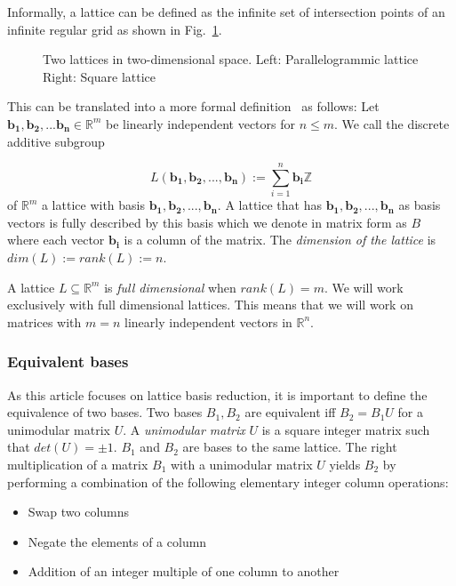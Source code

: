 \documentclass[10pt, a4paper]{article}
\renewcommand{\vec}[1]{\mathbf{#1}}
\begin{document}
Informally, a lattice can be defined as the infinite set of intersection points of an infinite regular grid as shown in Fig.~\ref{fig:latti}.
\begin{figure}
\centering

\hspace{2cm}


\caption{Two lattices in two-dimensional space. Left: Parallelogrammic lattice Right: Square lattice}
\label{fig:latti}
\end{figure}

This can be translated into a more formal definition~\cite{SchnorrStanfordNotes} as follows:\newline 
Let $\vec{b_1}, \vec{b_2}, ... \vec{b_n} \in \mathbb{R}^m$ be linearly independent vectors for $n\leq m$. We call the discrete additive subgroup

\[
L(\vec{b_1}, \vec{b_2},..., \vec{b_n}):= \displaystyle\sum_{i=1}^{n} \vec{b_i} \mathbb{Z}
\] of $\mathbb{R}^m$ a lattice with basis $\vec{b_1,b_2,...,b_n}$.
A lattice that has $\vec{b_1},\vec{b_2},...,\vec{b_n}$ as basis vectors is fully described by this basis which we denote in matrix form as $B$ where each vector $\vec{b_i}$ is a column of the matrix.
The \emph{dimension of the lattice} is $dim(L) := rank(L) := n$.

A lattice $L \subseteq \mathbb{R}^m$ is \emph{full dimensional} when $rank(L)=m$. We will work exclusively with full dimensional lattices. This means that we will work on matrices with $m=n$ linearly independent vectors in $\mathbb{R}^n$.

\subsubsection{Equivalent bases}

As this article focuses on lattice basis reduction, it is important to define the equivalence of two bases. Two bases $B_1 , B_2$ are equivalent iff $B_2 = B_1 U$ for a unimodular matrix $U$.
A \emph{unimodular matrix} $U$ is a square integer matrix such that $det(U) = \pm 1$. $B_1$ and $B_2$ are bases to the same lattice. The right multiplication of a matrix $B_1$ with a unimodular matrix $U$ yields $B_2$ by performing a combination of the following elementary integer column operations:
\begin{itemize}
\item Swap two columns
\item Negate the elements of a column
\item Addition of an integer multiple of one column to another
\end{itemize}
\end{document}
